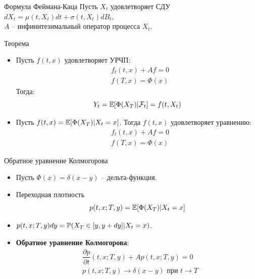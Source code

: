 \documentclass[aspectratio=169]{beamer}
\begin{document}
\begin{frame}{Формула Феймана-Каца}
    Пусть $X_t$ удовлетворяет СДУ $dX_t = \mu(t, X_t) dt + \sigma(t, X_t) dB_t$, \\ $A$ -- инфинитезимальный оператор процесса $X_t$. 
    \begin{block}{Теорема}
    \begin{itemize}
        \item Пусть $f(t, x)$ удовлетворяет УРЧП:
        \begin{align*}
            &f_t(t, x) + Af = 0 \\
            &f(T, x) = \Phi(x)
        \end{align*} Тогда:
        $$
            Y_t = \mathbb{E}[\Phi(X_T) | \mathcal{F}_t] = f(t, X_t)
        $$

        \item Пусть $f(t, x) = \mathbb{E}[\Phi(X_T) | X_t = x]$. Тогда $f(t, x)$ удовлетворяет уравнению:
        \begin{align*}
            &f_t(t, x) + Af = 0 \\
            &f(T, x) = \Phi(x)
        \end{align*}
    \end{itemize}
    \end{block}
\end{frame}

\begin{frame}{Обратное уравнение Колмогорова}
    \begin{itemize}
        \item Пусть $\Phi(x) = \delta(x-y)$ -- дельта-функция. 
        \item Переходная плотность $$p(t, x; T, y) = \mathbb{E}[\Phi(X_T) | X_t = x]$$
        \item $p(t, x; T, y) dy = \mathbb{P}(X_T \in [y, y + dy] | X_t = x)$.
        \item \textbf{Обратное уравнение Колмогорова}:
        \begin{align*}
            &\dfrac{\partial p}{\partial t}(t, x; T, y) + Ap(t, x; T, y) = 0 \\
            &p(t, x; T, y) \to \delta(x - y) \text{ при } t \to T
        \end{align*}
    \end{itemize}
\end{frame}
\end{document}
